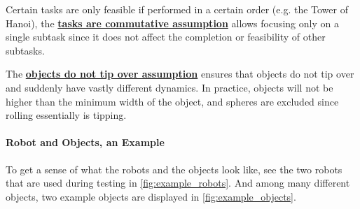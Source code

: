 Certain tasks are only feasible if performed in a certain order (e.g. the Tower of Hanoi), the \hyperref[assumption:order_does_not_matter]{\textbf{tasks are commutative assumption}} allows focusing only on a single subtask since it does not affect the completion or feasibility of other subtasks.\bs

The \hyperref[assumption:no_tipping]{\textbf{objects do not tip over assumption}} ensures that objects do not tip over and suddenly have vastly different dynamics. In practice, objects will not be higher than the minimum width of the object, and spheres are excluded since rolling essentially is tipping.

\paragraph{Robot and Objects, an Example}
To get a sense of what the robots and the objects look like, see the two robots that are used during testing in \cref{fig:example_robots}. And among many different objects, two example objects are displayed in \cref{fig:example_objects}.

